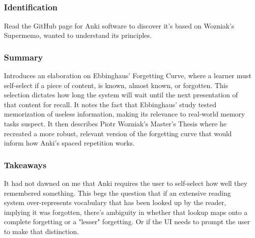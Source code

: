 \documentclass[
	letterpaper, %
]{jdf}
\begin{document}
\subsection{}
\subsubsection{Identification}
Read the GitHub page for Anki software to discover it's based on Wozniak's Supermemo, wanted to understand its principles.

\subsubsection{Summary}
Introduces an elaboration on Ebbinghaus' Forgetting Curve, where a learner must self-select if a piece of content, is known, almost known, or forgotten. This selection dictates how long the system will wait until the next presentation of that content for recall. It notes the fact that Ebbinghaus' study tested memorization of useless information, making its relevance to real-world memory tasks suspect. It then describes Piotr Wozniak's Master's Thesis where he recreated a more robust, relevant version of the forgetting curve that would inform how Anki's spaced repetition works.

\subsubsection{Takeaways}
It had not dawned on me that Anki requires the user to self-select how well they remembered something. This begs the question that if an extensive reading system over-represents vocabulary that has been looked up by the reader, implying it was forgotten, there's ambiguity in whether that lookup maps onto a complete forgetting or a "lesser" forgetting. Or if the UI needs to prompt the user to make that distinction.

\subsection{}
\end{document}
